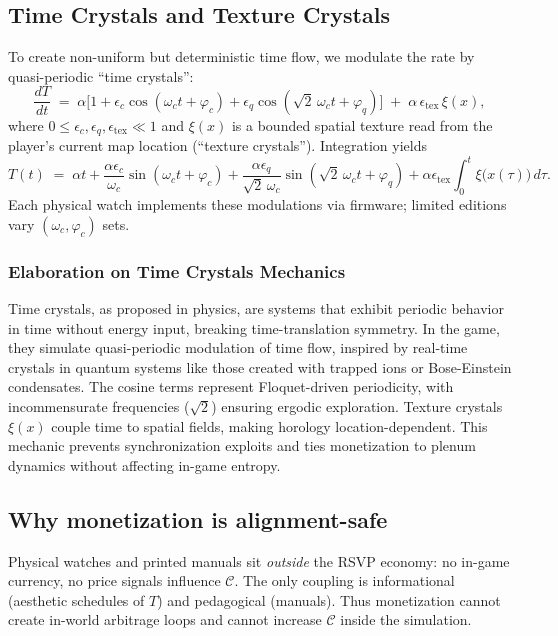 \documentclass[12pt]{article}
\theoremstyle{definition}
\begin{document}
\subsection{Time Crystals and Texture Crystals}
To create non-uniform but deterministic time flow, we modulate the rate by quasi-periodic ``time crystals'':
\[
\frac{dT}{dt} \;=\; \alpha\Big[1 + \epsilon_c \cos(\omega_c t + \varphi_c) + \epsilon_q \cos(\sqrt{2}\,\omega_c t + \varphi_q)\Big]
\;+\;
\alpha\,\epsilon_{\mathrm{tex}}\,\xi(x),
\]
where $0\le \epsilon_c,\epsilon_q,\epsilon_{\mathrm{tex}} \ll 1$ and $\xi(x)$ is a bounded spatial texture read from the player's current
map location (``texture crystals''). Integration yields
\[
T(t) \;=\; \alpha t
+ \frac{\alpha \epsilon_c}{\omega_c}\sin(\omega_c t+\varphi_c)
+ \frac{\alpha \epsilon_q}{\sqrt{2}\,\omega_c}\sin(\sqrt{2}\,\omega_c t+\varphi_q)
+ \alpha \epsilon_{\mathrm{tex}} \int_0^t \xi\big(x(\tau)\big)\,d\tau.
\]
Each physical watch implements these modulations via firmware; limited editions vary $(\omega_c,\varphi_c)$ sets.

\subsubsection{Elaboration on Time Crystals Mechanics}
Time crystals, as proposed in physics, are systems that exhibit periodic behavior in time without energy input, breaking time-translation symmetry. In the game, they simulate quasi-periodic modulation of time flow, inspired by real-time crystals in quantum systems like those created with trapped ions or Bose-Einstein condensates. The cosine terms represent Floquet-driven periodicity, with incommensurate frequencies ($\sqrt{2}$) ensuring ergodic exploration. Texture crystals $\xi(x)$ couple time to spatial fields, making horology location-dependent. This mechanic prevents synchronization exploits and ties monetization to plenum dynamics without affecting in-game entropy.

\subsection{Why monetization is alignment-safe}
Physical watches and printed manuals sit \emph{outside} the RSVP economy: no in-game currency, no price signals
influence $\mathcal{C}$. The only coupling is informational (aesthetic schedules of $T$) and pedagogical (manuals).
Thus monetization cannot create in-world arbitrage loops and cannot increase $\mathcal{C}$ inside the simulation.
\end{document}
